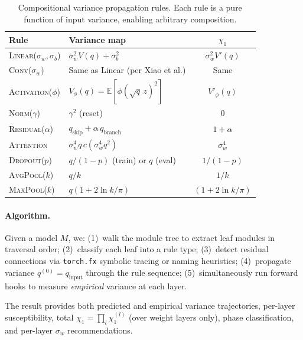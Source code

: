 \documentclass[10pt]{article}
\newcommand{\EE}{\mathbb{E}}
\begin{document}
\begin{table}[t]
\centering
\caption{Compositional variance propagation rules. Each rule is a pure function of input variance, enabling arbitrary composition.}
\label{tab:rules}
\small
\begin{tabular}{@{}llc@{}}
\toprule
\textbf{Rule} & \textbf{Variance map} & $\chi_1$ \\
\midrule
\textsc{Linear}($\sigma_w, \sigma_b$) & $\sigma_w^2 V(q) + \sigma_b^2$ & $\sigma_w^2 V'(q)$ \\
\textsc{Conv}($\sigma_w$) & Same as Linear (per Xiao et al.) & Same \\
\textsc{Activation}($\phi$) & $V_\phi(q) = \EE[\phi(\sqrt{q}\,z)^2]$ & $V'_\phi(q)$ \\
\textsc{Norm}($\gamma$) & $\gamma^2$ (reset) & $0$ \\
\textsc{Residual}($\alpha$) & $q_{\mathrm{skip}} + \alpha\, q_{\mathrm{branch}}$ & $1 + \alpha$ \\
\textsc{Attention} & $\sigma_w^4 q\, c(\sigma_w^4 q^2)$ & $\sigma_w^4$ \\
\textsc{Dropout}($p$) & $q/(1-p)$ (train) or $q$ (eval) & $1/(1-p)$ \\
\textsc{AvgPool}($k$) & $q/k$ & $1/k$ \\
\textsc{MaxPool}($k$) & $q(1 + 2\ln k/\pi)$ & $(1 + 2\ln k/\pi)$ \\
\bottomrule
\end{tabular}
\end{table}

\paragraph{Algorithm.}
Given a model $M$, we:
(1)~walk the module tree to extract leaf modules in traversal order;
(2)~classify each leaf into a rule type;
(3)~detect residual connections via \texttt{torch.fx} symbolic tracing or naming heuristics;
(4)~propagate variance $q^{(0)} = q_{\mathrm{input}}$ through the rule sequence;
(5)~simultaneously run forward hooks to measure \emph{empirical} variance at each layer.

The result provides both predicted and empirical variance trajectories, per-layer susceptibility, total $\chi_1 = \prod_l \chi_1^{(l)}$ (over weight layers only), phase classification, and per-layer $\sigma_w$ recommendations.
\end{document}

